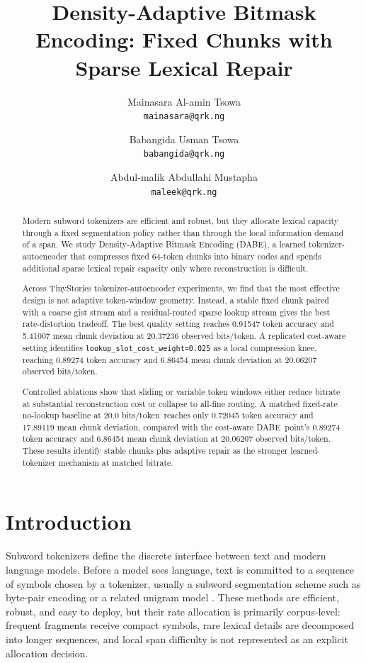 \documentclass[11pt]{article}
\title{Density-Adaptive Bitmask Encoding: Fixed Chunks with Sparse Lexical Repair}
\author{
Mainasara Al-amin Tsowa\\
\texttt{mainasara@qrk.ng}
\and
Babangida Usman Tsowa\\
\texttt{babangida@qrk.ng}
\and
Abdul-malik Abdullahi Mustapha\\
\texttt{maleek@qrk.ng}
}
\date{}
\newcommand{\dabe}{\textsc{DABE}}
\newcommand{\bitsper}{bits/token}
\begin{document}
\maketitle

\begin{abstract}
Modern subword tokenizers are efficient and robust, but they allocate lexical capacity through a fixed segmentation policy rather than through the local information demand of a span. We study Density-Adaptive Bitmask Encoding (\dabe), a learned tokenizer-autoencoder that compresses fixed 64-token chunks into binary codes and spends additional sparse lexical repair capacity only where reconstruction is difficult.

Across TinyStories tokenizer-autoencoder experiments, we find that the most effective design is not adaptive token-window geometry. Instead, a stable fixed chunk paired with a coarse gist stream and a residual-routed sparse lookup stream gives the best rate-distortion tradeoff. The best quality setting reaches 0.91547 token accuracy and 5.41007 mean chunk deviation at 20.37236 observed \bitsper. A replicated cost-aware setting identifies \texttt{lookup\_slot\_cost\_weight=0.025} as a local compression knee, reaching 0.89274 token accuracy and 6.86454 mean chunk deviation at 20.06207 observed \bitsper.

Controlled ablations show that sliding or variable token windows either reduce bitrate at substantial reconstruction cost or collapse to all-fine routing. A matched fixed-rate no-lookup baseline at 20.0 \bitsper\ reaches only 0.72045 token accuracy and 17.89119 mean chunk deviation, compared with the cost-aware \dabe\ point's 0.89274 token accuracy and 6.86454 mean chunk deviation at 20.06207 observed \bitsper. These results identify stable chunks plus adaptive repair as the stronger learned-tokenizer mechanism at matched bitrate.
\end{abstract}

\section{Introduction}
Subword tokenizers define the discrete interface between text and modern language models. Before a model sees language, text is committed to a sequence of symbols chosen by a tokenizer, usually a subword segmentation scheme such as byte-pair encoding or a related unigram model \cite{sennrich2016bpe,kudo2018sentencepiece}. These methods are efficient, robust, and easy to deploy, but their rate allocation is primarily corpus-level: frequent fragments receive compact symbols, rare lexical details are decomposed into longer sequences, and local span difficulty is not represented as an explicit allocation decision.
\end{document}
